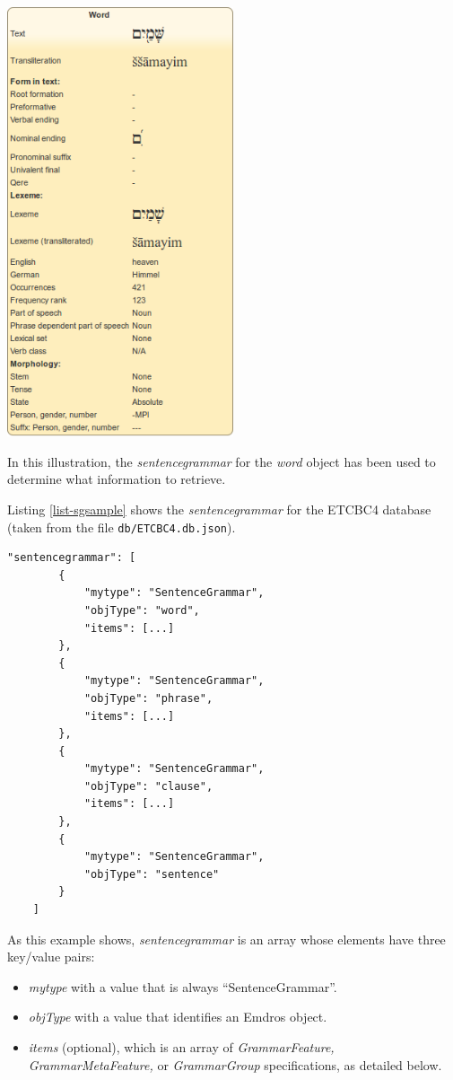 \documentclass[11pt,oneside,a4paper]{memoir}
\begin{document}
\begin{center}
  \includegraphics[width=0.5\textwidth]{grammarinfo.png}
\end{center}

In this illustration, the \emph{sentencegrammar} for the \emph{word} object
has been used to determine what information to retrieve.

Listing \ref{list-sgsample} shows the \emph{sentencegrammar} for the ETCBC4 database (taken from the
file \texttt{db/ETCBC4.db.json}).

\begin{lstlisting}[caption=Condensed sentencegrammar value,label=list-sgsample]
    "sentencegrammar": [
        {
            "mytype": "SentenceGrammar",
            "objType": "word",
            "items": [...]
        },
        {
            "mytype": "SentenceGrammar",
            "objType": "phrase",
            "items": [...]
        },
        {
            "mytype": "SentenceGrammar",
            "objType": "clause",
            "items": [...]
        },
        {
            "mytype": "SentenceGrammar",
            "objType": "sentence"
        }
    ]
\end{lstlisting}

As this example shows, \emph{sentencegrammar} is an array whose elements have
three key/value pairs:

\begin{itemize}
\item \emph{mytype} with a value that is always ``SentenceGrammar''.
\item \emph{objType} with a value that identifies an Emdros object.
\item \emph{items} (optional), which is an array of \emph{GrammarFeature,
  GrammarMetaFeature,} or \emph{GrammarGroup} specifications, as detailed below.
\end{itemize}
\end{document}
